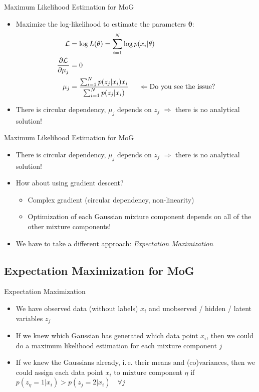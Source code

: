 \begin{frame}{Maximum Likelihood Estimation for MoG}{}
	\begin{itemize}
		\item Maximize the log-likelihood to estimate the parameters $\bm{\theta}$:
		\begin{align}
			\mathcal{L} &= \log L(\theta) = \sum_{i=1}^N \log p(x_i|\theta)\\
			\frac{\partial \mathcal{L}}{\partial \mu_j} &= 0\\
			\mu_j &= \frac{\sum_{i=1}^N p(z_j|x_i) x_i}{\sum_{i=1}^N p(z_j|x_i)}\hspace{0.5cm} \Leftarrow \text{Do you see the issue?}
		\end{align}
		\item There is circular dependency, $\mu_j$ depends on $z_j$ $\Rightarrow$ there is no analytical solution!
	\end{itemize}
\end{frame}

\begin{frame}{Maximum Likelihood Estimation for MoG}{}
	\begin{itemize}
		\item There is circular dependency, $\mu_j$ depends on $z_j$ $\Rightarrow$ there is no analytical solution!
		\item How about using gradient descent?
		\begin{itemize}
			\item Complex gradient (circular dependency, non-linearity)
			\item Optimization of each Gaussian mixture component depends on all of the other mixture components!
		\end{itemize}
		\item We have to take a different approach: \textit{Expectation Maximization}
	\end{itemize}
\end{frame}

\subsection{Expectation Maximization for MoG}
\begin{frame}{Expectation Maximization}{}
	\begin{itemize}
		\item We have observed data (without labels) $x_i$ and unobserved / hidden / latent variables $z_j$
		\item If we knew which Gaussian has generated which data point $x_i$, then we could do a maximum likelihood estimation for each mixture component $j$
		\item If we knew the Gaussians already, i.\,e. their means and (co)variances, then we could assign each data point $x_i$ to mixture component $\eta$ if $p(z_\eta = 1|x_i) > p(z_j = 2|x_i) \quad \forall j$
	\end{itemize}
\end{frame}

